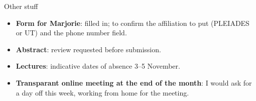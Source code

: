 \documentclass[10pt,aspectratio=169]{beamer}
\begin{document}
\begin{frame}{Other stuff}
\small
\begin{itemize}
\item \textbf{Form for Marjorie}: filled in; to confirm the affiliation to put (PLEIADES or UT) and the phone number field.
\item \textbf{Abstract}: review requested before submission.
\item \textbf{Lectures}: indicative dates of absence 3--5 November.
\item \textbf{Transparant online meeting at the end of the month}: I would ask for a day off this week, working from home for the meeting.
\end{itemize}
\end{frame}
\end{document}
